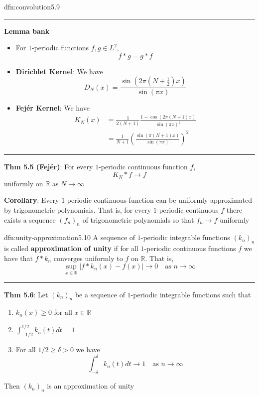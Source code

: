 \documentclass[landscape, 8pt]{extarticle}
\begin{document}
\begin{multicols}{3}
\begin{dfn}[Convolution]{dfn:convolution}{5.9}
	\noindent\rule{\textwidth}{0.2pt}
	\textbf{Lemma bank}
	\begin{itemize}
	    \setlength\itemsep{0em}
	    \item[\textbf{5.2}] For $1$-periodic functions $f, g\in L^{2}$,
			\[f * g = g * f\]
		\item[\textbf{5.3}] \textbf{Dirichlet Kernel}: We have
			\[D_{N}(x) = \frac{\sin(2 \pi(N + \frac{1}{2})x)}{\sin( \pi x)}\]
		\item[\textbf{5.4}] \textbf{Fejér Kernel}:  We have
			\begin{align*}
				K_{N}(x) &= \frac{1}{2(N+1)} \frac{1 - \cos(2\pi(N + 1)x)}{\sin(\pi x)^{2}}\\
						 &= \frac{1}{N+1} \left( \frac{\sin(\pi(N + 1) x)}{\sin(\pi x)}\right)^{2}
			\end{align*}
	\end{itemize}
	\noindent\rule{\textwidth}{0.2pt}
	\textbf{Thm 5.5 (Fejér)}: For every $1$-periodic continuous function $f$,
	\[K_{N} * f \to f\]
	uniformly on $\mathbb{R}$ as $N\to\infty$

	\textbf{Corollary}: Every $1$-periodic continuous function can be uniformly approximated by trigonometric polynomials. That is, for every $1$-periodic continuous $f$ there exists a sequence $(f_{n})_{n}$ of trigonometric polynomials so that $f_{n} \to f$ uniformly
\end{dfn}

\newpage
\begin{dfn}{dfn:unity-approximation}{5.10}
	A sequence of $1$-periodic integrable functions $(k_{n})_{n}$ is called \textbf{approximation of unity} if for all $1$-periodic continuous functions $f$ we have that $f * k_{n}$ converges uniformly to $f$ on $\mathbb{R}$. That is,
	\[\sup_{x\in\mathbb{R}} \lvert f * k_{n}(x) - f(x) \rvert \to 0 \quad \text{as $n\to\infty$}\]

	\noindent\rule{\textwidth}{0.2pt}
	\textbf{Thm 5.6}: Let $(k_{n})_{n}$ be a sequence of $1$-periodic integrable functions such that
	\begin{enumerate}
	    \item $k_{n}(x) \ge 0$ for all $x\in\mathbb{R}$
	    \item $\int_{-1 /2}^{1 /2} k_{n}(t) dt = 1$
	    \item For all $1 /2 \ge \delta > 0$ we have
			\[\int_{-\delta}^{\delta} k_{n}(t) dt \to 1 \quad\text{as $n\to\infty$}\]
	\end{enumerate}

	Then $(k_{n})_{n}$ is an approximation of unity


\end{dfn}
\end{multicols}
\end{document}
